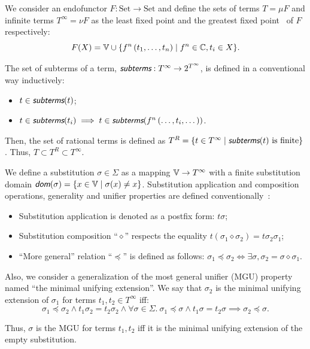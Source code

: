 We consider an endofunctor $F : \text{Set} \rightarrow \text{Set}$ and define the sets of terms $T = \mu F$ and infinite terms $T^\infty = \nu F$ as the least fixed point and the greatest fixed point~\cite{simon2006coinductive} of $F$ respectively:
\[F(X) = \mathbb{V} \cup \{ f^n\,(t_1, \dots, t_n) \mid f^n \in \mathbb{C}, t_i \in X \}.\]

The set of subterms of a term, $\subterms : T^\infty \rightarrow 2^{T^\infty}$, is defined in a conventional way inductively:
\begin{itemize}
    \item $t \in \subterms(t)$;
    \item $t \in \subterms(t_i) \implies t \in \subterms(f^n\,(\dots, t_i, \dots))$.
\end{itemize}

Then, the set of rational terms is defined as $T^R = \{ t \in T^\infty \mid \subterms(t) \text{ is finite} \}$. Thus, $T \subset T^R \subset T^\infty$.

We define a substitution $\sigma \in \Sigma$ as a mapping $\mathbb{V} \rightarrow T^\infty$ with a finite substitution domain $\dom(\sigma) = \{ x \in \V \mid \sigma(x) \neq x \}$. Substitution application and composition operations, generality and unifier properties are defined conventionally~\cite{baader2001unification}:
\begin{itemize}
    \item Substitution application is denoted as a postfix form: $t \sigma$;
    \item Substitution composition ``$\diamond$'' respects the equality $t (\sigma_1 \diamond \sigma_2) = t\sigma_2\sigma_1$;
    \item ``More general'' relation ``$\preceq$'' is defined as follows: $\sigma_1 \preceq \sigma_2 \iff \exists \sigma, \sigma_2 = \sigma \diamond \sigma_1$.
\end{itemize}

Also, we consider a generalization of the most general unifier (MGU) property named ``the minimal unifying extension''. We say that $\sigma_2$ is the minimal unifying extension of $\sigma_1$ for terms $t_1, t_2 \in T^\infty$ iff:
\[ \sigma_1 \preceq \sigma_2 \land t_1 \sigma_2 = t_2 \sigma_2 \land \forall \sigma \in \Sigma. ~ \sigma_1 \preceq \sigma \land t_1 \sigma = t_2 \sigma \implies \sigma_2 \preceq \sigma. \]

Thus, $\sigma$ is the MGU for terms $t_1, t_2$ iff it is the minimal unifying extension of the empty substitution.


